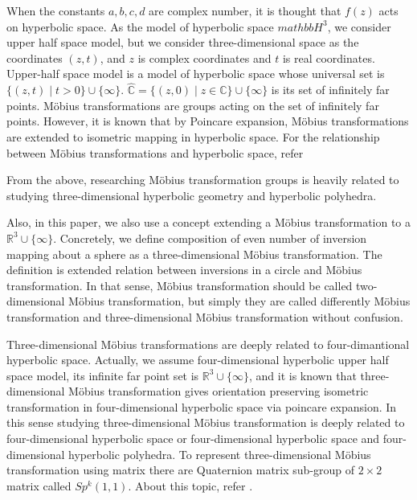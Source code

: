 When the constants $a, b, c, d$ are complex number, it is thought that
$f(z)$ acts on hyperbolic space.
As the model of hyperbolic space $mathbb{H}^3$, we consider upper half
space model, but we consider three-dimensional space as the coordinates
$(z, t)$, and $z$ is complex coordinates and $t$ is real coordinates.
Upper-half space model is a model of hyperbolic space whose universal
set is $\{(z,t) \mid t>0\}\cup \{ \infty \}$.
$\hat{\mathbb{C}} = \{ (z,0) \mid z \in \mathbb{C}\} \cup \{ \infty\}$
is its set of infinitely far points. M\"obius transformations are groups acting on
the set of infinitely far points. However, it is known that by Poincare
expansion, M\"obius transformations are extended to isometric mapping
in hyperbolic space.
For the relationship between M\"obius transformations and hyperbolic
space, refer 
\cite{Marden200705outerCircles}\cite{taniguchi_okumura199610invitation}

From the above, researching M\"obius transformation groups is heavily
related to studying three-dimensional hyperbolic geometry and hyperbolic
polyhedra.

Also, in this paper, we also use a concept extending a M\"obius
transformation to a $\mathbb{R}^3\cup\{\infty\}$.
Concretely, we define composition of even number of inversion mapping
about a sphere as a three-dimensional M\"obius transformation.
The definition is extended relation between inversions in a circle and
M\"obius transformation.
In that sense, M\"obius transformation should be called two-dimensional
M\"obius transformation, but
simply they are called differently M\"obius transformation and
three-dimensional M\"obius transformation without confusion.

Three-dimensional M\"obius transformations are deeply related to
four-dimantional hyperbolic space. Actually, we assume four-dimensional
hyperbolic upper half space model, its infinite far point set is
$\mathbb{R}^3\cup\{\infty\}$, and it is known that three-dimensional M\"obius
transformation gives orientation preserving isometric transformation in
four-dimensional hyperbolic space via poincare expansion.
In this sense studying three-dimensional M\"obius transformation is
deeply related to four-dimensional hyperbolic space or four-dimensional
hyperbolic space and four-dimensional hyperbolic polyhedra.
To represent three-dimensional M\"obius transformation using matrix
there are Quaternion matrix sub-group of $2 \times 2$ matrix called
$Sp^k(1,1)$. About this topic, refer
\cite{sakugawa2010limit}\cite{sakugawa2007master}.


